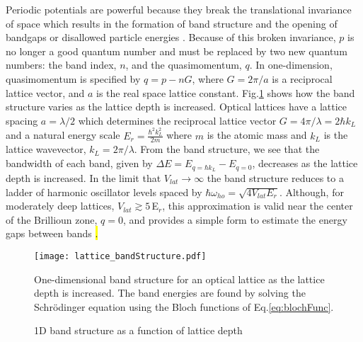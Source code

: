Periodic potentials are powerful because they break the translational invariance of space which results in the formation of band structure and the opening of bandgaps or disallowed particle energies \hl{\cite{Ashcroft1976}}.
Because of this broken invariance, $p$ is no longer a good quantum number and must be replaced by two new quantum numbers: the band index, $n$, and the quasimomentum, $q$.
In one-dimension, quasimomentum is specified by $q = p - nG$, where $G=2\pi/a$ is a reciprocal lattice vector, and $a$ is the real space lattice constant.
Fig.\;\ref{fig:bandStructure} shows how the band structure varies as the lattice depth is increased.
Optical lattices have a lattice spacing $a = \lambda /2$ which determines the reciprocal lattice vector $G = 4\pi / \lambda = 2 \hbar k_L$ and a natural energy scale $E_r = \frac{\hbar^2 k_L^2}{2m}$ where $m$ is the atomic mass and $k_L$ is the lattice wavevector, $k_L = 2\pi / \lambda$.
From the band structure, we see that the bandwidth of each band, given by $\Delta E = E_{q=\hbar k_L} - E_{q=0}$, decreases as the lattice depth is increased.
In the limit that $V_{lat}\!\rightarrow\!\infty$ the band structure reduces to a ladder of harmonic oscillator levels spaced by $\hbar \omega_{ho} = \sqrt{4 V_{lat} E_r}$.
Although, for moderately deep lattices, $V_{lat} \gtrsim 5\,$E$_r$, this approximation is valid near the center of the Brillioun zone, $q = 0$, and provides a simple form to estimate the energy gaps between bands \hl{\hl{\cite{Jaksch1998,Jaksch2005}}.}
	\begin{figure} \label{fig:bandStructure}
		\centerline{
		\texttt{[image: lattice\_bandStructure.pdf]}}
		\caption{1D band structure as a function of lattice depth}{One-dimensional band structure for an optical lattice as the lattice depth is increased. The band energies are found by solving the Schr\"{o}dinger equation using the Bloch functions of Eq.\;\ref{eq:blochFunc}.}
	\end{figure}

